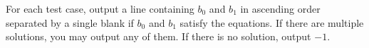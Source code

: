 For each test case, output a line containing $b_0$ and $b_1$ in 
ascending order separated by a single blank if $b_0$ and $b_1$ satisfy
the equations.
If there are multiple solutions, you may output any of them.
If there is no solution, output $-1$.
